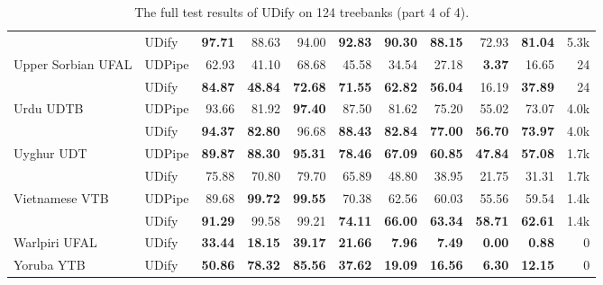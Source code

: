\documentclass[11pt,a4paper]{article}
\begin{document}
\begin{table*}
\begin{center}
\begin{tabular}{@{}llrrrrrrrrr@{}}
               & UDify &  \bf 97.71 &      88.63 &       94.00 &  \bf 92.83 &  \bf 90.30 &  \bf 88.15 &      72.93 &  \bf 81.04 &   5.3k \\
    \addlinespace
    Upper Sorbian UFAL & UDPipe &      62.93 &      41.10 &       68.68 &      45.58 &      34.54 &      27.18 &   \bf 3.37 &      16.65 &     24 \\
               & UDify &  \bf 84.87 &  \bf 48.84 &   \bf 72.68 &  \bf 71.55 &  \bf 62.82 &  \bf 56.04 &      16.19 &  \bf 37.89 &     24 \\
    \addlinespace
    Urdu UDTB & UDPipe &      93.66 &      81.92 &   \bf 97.40 &      87.50 &      81.62 &      75.20 &      55.02 &      73.07 &   4.0k \\
               & UDify &  \bf 94.37 &  \bf 82.80 &       96.68 &  \bf 88.43 &  \bf 82.84 &  \bf 77.00 &  \bf 56.70 &  \bf 73.97 &   4.0k \\
    \addlinespace
    Uyghur UDT & UDPipe &  \bf 89.87 &  \bf 88.30 &   \bf 95.31 &  \bf 78.46 &  \bf 67.09 &  \bf 60.85 &  \bf 47.84 &  \bf 57.08 &   1.7k \\
               & UDify &      75.88 &      70.80 &       79.70 &      65.89 &      48.80 &      38.95 &      21.75 &      31.31 &   1.7k \\
    \addlinespace
    Vietnamese VTB & UDPipe &      89.68 &  \bf 99.72 &   \bf 99.55 &      70.38 &      62.56 &      60.03 &      55.56 &      59.54 &   1.4k \\
               & UDify &  \bf 91.29 &      99.58 &       99.21 &  \bf 74.11 &  \bf 66.00 &  \bf 63.34 &  \bf 58.71 &  \bf 62.61 &   1.4k \\
    \addlinespace
    Warlpiri UFAL & UDify &  \bf 33.44 &  \bf 18.15 &   \bf 39.17 &  \bf 21.66 &   \bf 7.96 &   \bf 7.49 &   \bf 0.00 &   \bf 0.88 &      0 \\
    \addlinespace
    Yoruba YTB & UDify &  \bf 50.86 &  \bf 78.32 &   \bf 85.56 &  \bf 37.62 &  \bf 19.09 &  \bf 16.56 &   \bf 6.30 &  \bf 12.15 &      0 \\
    \bottomrule
    \end{tabular}
    \end{center}
    \caption{\label{table:full-results-4} The full test results of UDify on 124 treebanks (part 4 of 4).}
\end{table*}
\end{document}
